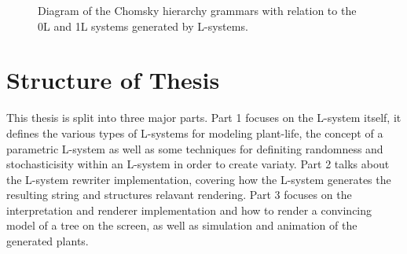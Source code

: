 \begin{figure}[htbp]
	{\centering
		\setlength{\fboxrule}{1pt}
		\vspace{7px}
		\caption{Diagram of the Chomsky hierarchy grammars with relation to the 0L and 1L systems generated by L-systems.} \label{chomsky grammars}
	}
\end{figure}
\FloatBarrier

\section{Structure of Thesis}

This thesis is split into three major parts. Part 1 focuses on the L-system itself, it defines the various types of L-systems for modeling plant-life, the concept of a parametric L-system as well as some techniques for definiting randomness and stochasticisity within an L-system in order to create variaty. Part 2 talks about the L-system rewriter implementation, covering how the L-system generates the resulting string and structures relavant rendering. Part 3 focuses on the interpretation and renderer implementation and how to render a convincing model of a tree on the screen, as well as simulation and animation of the generated plants.





